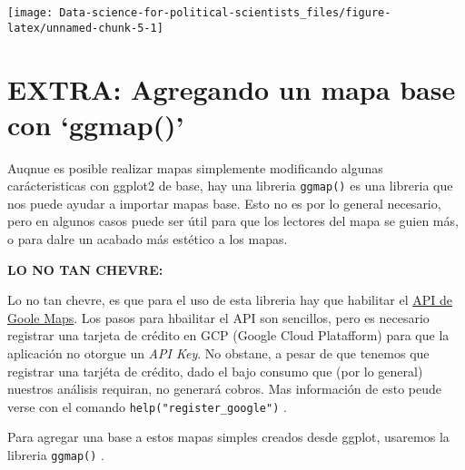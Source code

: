 \documentclass[
]{book}
\begin{document}
\begin{center}\texttt{[image: Data-science-for-political-scientists\_files/figure-latex/unnamed-chunk-5-1]} \end{center}

\hypertarget{extra-agregando-un-mapa-base-con-ggmap}{%
\section{EXTRA: Agregando un mapa base con `ggmap()'}\label{extra-agregando-un-mapa-base-con-ggmap}}

Auqnue es posible realizar mapas simplemente modificando algunas carácteristicas con ggplot2 de base, hay una libreria \texttt{ggmap()} es una libreria que nos puede ayudar a importar mapas base. Esto no es por lo general necesario, pero en algunos casos puede ser útil para que los lectores del mapa se guien más, o para dalre un acabado más estético a los mapas.

\textbf{LO NO TAN CHEVRE:}

Lo no tan chevre, es que para el uso de esta libreria hay que habilitar el \href{https://mapsplatform.google.com/}{API de Goole Maps}. Los pasos para hbailitar el API son sencillos, pero es necesario registrar una tarjeta de crédito en GCP (Google Cloud Platafform) para que la aplicación no otorgue un \emph{API Key}. No obstane, a pesar de que tenemos que registrar una tarjéta de crédito, dado el bajo consumo que (por lo general) nuestros análisis requiran, no generará cobros. Mas información de esto peude verse con el comando \texttt{help("register\_google")} .

Para agregar una base a estos mapas simples creados desde ggplot, usaremos la libreria \texttt{ggmap()} .
\end{document}
